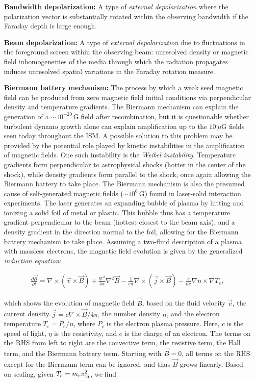 \documentclass[a4paper,10pt]{article}
\begin{document}
{\noindent}\textbf{Bandwidth depolarization:} A type of \textit{external depolarization} where the polarization vector is substantially rotated within the observing bandwidth if the Faraday depth is large enough.

{\noindent}\textbf{Beam depolarization:} A type of \textit{external depolarization} due to fluctuations in the foreground screen within the observing beam: unresolved density or magnetic field inhomogeneities of the media through which the radiation propagates induces unresolved spatial variations in the Faraday rotation measure.

{\noindent}\textbf{Biermann battery mechanism:} The process by which a weak seed magnetic field can be produced from zero magnetic field initial conditions via perpendicular density and temperature gradients. The Biermann mechanism can explain the generation of a $\sim10^{-20}\,$G field after recombination, but it is questionable whether turbulent dynamo growth alone can explain amplification up to the $10\,\mu$G fields seen today throughout the ISM. A possible solution to this problem may be provided by the potential role played by kinetic instabilities in the amplification of magnetic fields. One such instability is the \textit{Weibel instability}. Temperature gradients form perpendicular to astrophysical shocks (hotter in the center of the shock), while density gradients form parallel to the shock, once again allowing the Biermann battery to take place. The Biermann mechanism is also the presumed cause of self-generated magnetic fields ($\sim10^6\,$G) found in laser-solid interaction experiments. The laser generates an expanding bubble of plasma by hitting and ionizing a solid foil of metal or plastic. This bubble thus has a temperature gradient perpendicular to the beam (hottest closest to the beam axis), and a density gradient in the direction normal to the foil, allowing for the Biermann battery mechanism to take place. Assuming a two-fluid description of a plasma with massless electrons, the magnetic field evolution is given by the generalized \textit{induction equation}:

\begin{align*}
    \frac{\partial\vec{B}}{\partial t} = \nabla\times(\vec{v}\times\vec{B}) + \frac{\eta c^2}{4\pi}\nabla^2\vec{B} - \frac{1}{en}\nabla\times(\vec{j}\times\vec{B}) - \frac{c}{ne}\nabla n\times\nabla T_e,
\end{align*}

{\noindent}which shows the evolution of magnetic field $\vec{B}$, based on the fluid velocity $\vec{v}$, the current density $\vec{j}=c\nabla\times\vec{B}/4\pi$, the number density $n$, and the electron temperature $T_e=P_e/n$, where $P_e$ is the electron plasma pressure. Here, $c$ is the speed of light, $\eta$ is the resistivity, and $e$ is the charge of an electron. The terms on the RHS from left to right are the convective term, the resistive term, the Hall term, and the Biermann battery term. Starting with $\vec{B}=0$, all terms on the RHS except for the Biermann term can be ignored, and thus $\vec{B}$ grows linearly. Based on scaling, given $T_e=m_ev_{\rm th}^2$, we find
\end{document}
